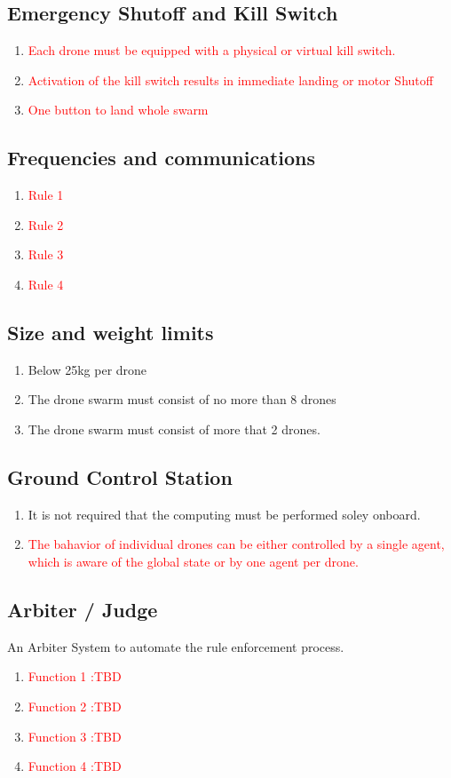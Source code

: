 \subsection{Emergency Shutoff and Kill Switch}
\begin{enumerate}
	\item{\textcolor{red}{Each drone must be equipped with a physical or virtual kill switch.}}
	\item{\textcolor{red}{Activation of the kill switch results in immediate landing or motor Shutoff}}
	\item{\textcolor{red}{One button to land whole swarm}}
\end{enumerate}

\subsection{Frequencies and communications}
\begin{enumerate}
	\item{\textcolor{red}{Rule 1}}
	\item{\textcolor{red}{Rule 2}}
	\item{\textcolor{red}{Rule 3}}
	\item{\textcolor{red}{Rule 4}}
\end{enumerate}

\subsection{Size and weight limits}
\begin{enumerate}
	\item{Below 25kg per drone}
	\item{The drone swarm must consist of no more than 8 drones}
	\item{The drone swarm must consist of more that 2 drones.}
\end{enumerate}

\subsection{Ground Control Station}
\begin{enumerate}
	\item{It is not required that the computing must be performed soley onboard.}
	\item{\textcolor{red}{The bahavior of individual drones can be either controlled by a single agent, which is aware of the global state or by one agent per drone.}}
\end{enumerate}

\subsection{Arbiter / Judge}
An Arbiter System to automate the rule enforcement process.
\begin{enumerate}

	\item{\textcolor{red}{Function 1 :TBD}}
	\item{\textcolor{red}{Function 2 :TBD}}
	\item{\textcolor{red}{Function 3 :TBD}}
	\item{\textcolor{red}{Function 4 :TBD}}
\end{enumerate}